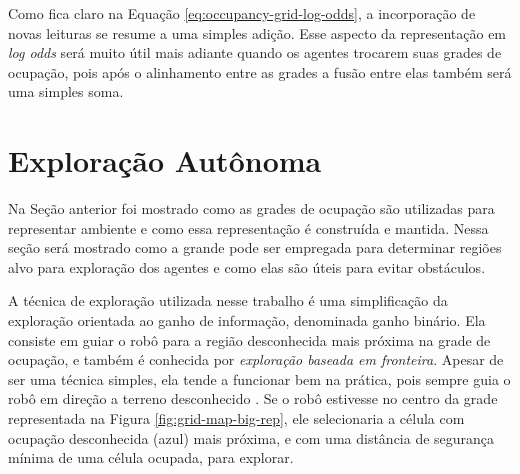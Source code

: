 Como fica claro na Equação \ref{eq:occupancy-grid-log-odds}, a 
incorporação de novas leituras se resume a uma simples adição. Esse 
aspecto da representação em \textit{log odds} será muito útil mais 
adiante quando os agentes trocarem suas grades de ocupação, pois após 
o alinhamento entre as grades a fusão entre elas também será uma simples 
soma.

\section{Exploração Autônoma}

Na Seção anterior foi mostrado como as grades de ocupação são utilizadas 
para representar ambiente e como essa representação é construída e 
mantida. Nessa seção será mostrado como a grande pode ser empregada para 
determinar regiões alvo para exploração dos agentes e como elas são 
úteis para evitar obstáculos.

A técnica de exploração utilizada nesse trabalho é uma simplificação 
da exploração orientada ao ganho de informação, denominada ganho binário. 
Ela consiste em guiar o robô para a região desconhecida mais próxima 
na grade de ocupação, e também é conhecida por \emph{exploração baseada em fronteira}. Apesar de ser uma técnica simples, ela tende a funcionar 
bem na prática, pois sempre guia o robô em direção a terreno desconhecido 
\cite[p.~584]{bongard2006probabilistic}. Se o robô estivesse no centro 
da grade representada na Figura \ref{fig:grid-map-big-rep}, ele 
selecionaria a célula com ocupação desconhecida (azul) mais próxima, e com uma distância de segurança mínima de uma célula ocupada, para 
explorar.

